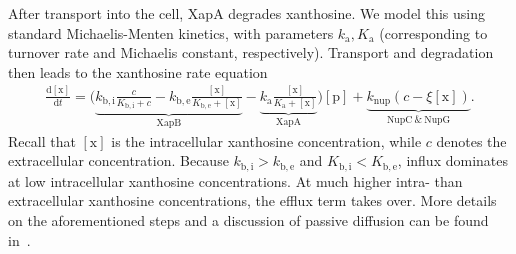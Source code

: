 \documentclass[10pt,letterpaper]{article}
\newcommand{\n}[1]{\mathrm{#1}}
\newcommand{\dd}[2]{\frac{\mathrm{d} #1}{\mathrm{d} #2}}
\begin{document}
	After transport into the cell, XapA degrades xanthosine. We model this using
	standard Michaelis-Menten kinetics, with parameters $k_{\n{a}}, K_{\n{a}}$
	(corresponding to turnover rate and Michaelis constant, respectively). Transport and degradation then leads to the xanthosine rate equation
	\begin{eqnarray}
	\dd{\n{[x]}}{t} = \biggl(\underbrace{k_{\n{b,i}} \frac{c}{K_{\n{b,i}} + c} - k_{\n{b,e}} \frac{\n{[x]}}{K_{\n{b,e}} + \n{[x]}}}_{\n{XapB}} - \underbrace{k_{\n{a}} \frac{\n{[x]}}{K_{\n{a}} + \n{[x]}}}_{\n{XapA}}\biggr) \n{[p]} + \underbrace{k_{\n{nup}} \left(c- \xi \n{[x]}\right)}_{\n{NupC\ \& \ NupG}}.
	\end{eqnarray}
	Recall that $\n{[x]}$ is the intracellular xanthosine concentration, while
	$c$ denotes the extracellular concentration. Because $k_{\n{b,i}} > k_{\n{b,e}}$ and
	$K_{\n{b,i}} < K_{\n{b,e}}$, influx dominates at low intracellular
	xanthosine concentrations. At much higher intra- than extracellular
	xanthosine concentrations, the efflux term takes over. More details on the
	aforementioned steps and a discussion of passive diffusion can be found
	in~.
	
\end{document}
